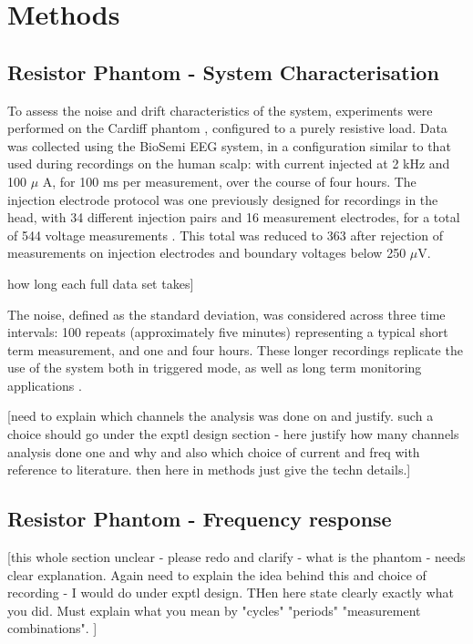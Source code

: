 \section{Methods}
\subsection{Resistor Phantom - System Characterisation}

To assess the noise and drift characteristics of the system, experiments were performed on the Cardiff phantom \cite{griffiths1995cole}, configured to a purely resistive load. Data was collected using the BioSemi EEG system, in a configuration similar to that used during recordings on the human scalp: with current injected at 2 kHz and 100 $\mu$ A, for 100 ms per measurement, over the course of four hours. The injection electrode protocol was one previously designed for recordings in the head, with 34 different injection pairs and 16 measurement electrodes, for a total of 544 voltage measurements \cite{Fabrizi2009}. This total was reduced to 363 after rejection of measurements on injection electrodes and boundary voltages below 250 $\mu$V. 

 how long each full data set takes] 

The noise, defined as the standard deviation, was considered across three time intervals: 100 repeats (approximately five minutes) representing a typical short term measurement, and one and four hours. These longer recordings replicate the use of the system both in triggered mode, as well as long term monitoring applications \cite{fu2014use} \cite{adler2012whither}.

[need to explain which channels the analysis was done on and justify. such a choice should go under the exptl design section - here justify how many channels analysis done one and why and also which choice of current and freq with reference to literature. then here in methods just give the techn details.]

\subsection{Resistor Phantom - Frequency response}

[this whole section unclear - please redo and clarify - what is the phantom - needs clear explanation. Again need to explain the idea behind this and choice of recording - I would do under exptl design. THen here state clearly exactly what you did.  Must explain what you mean by "cycles" "periods" "measurement combinations". ] 

